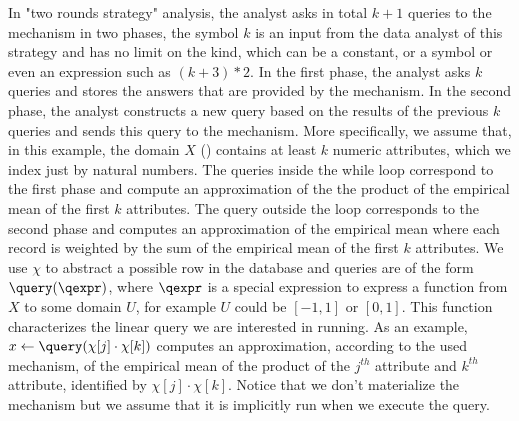 In "two rounds strategy" analysis, the analyst asks in total $k+1$ queries to the mechanism in two phases, the symbol $k$ is an input from the data analyst of this strategy and has no limit on the kind, which can be a constant, or a symbol or even an expression such as $(k+3)*2$.
In the first phase, the analyst asks $k$ queries and stores the answers that are provided by the mechanism. In the second phase, the analyst constructs a new query based on the results of the previous $k$ queries and sends this query to the mechanism. More specifically, we assume that, in this example, the domain $X$ 
() 
contains at least $k$ numeric attributes, which we index just by natural numbers. The queries inside the while loop correspond to the first phase and compute an approximation of the 
the product of the empirical mean of the first $k$ attributes. 
The query outside the loop corresponds to the second phase and computes an approximation of the empirical mean where each record is weighted by the sum of the empirical mean of the first $k$ attributes.
%
%
{We use $\chi$ to abstract a possible row in the database and }
queries are of the form $\query(\qexpr)$, where $\qexpr$ is a special expression 
to express a function from $X$ to some domain $U$, for example $U$ could be $[-1,1]$ or $[0,1]$. This function characterizes the linear query we are interested in running. As an example, $x \leftarrow \query(\chi[j] \cdot \chi[k])$ computes an approximation, according to the used mechanism, of the empirical mean of the product of the $j^{th}$ attribute and $k^{th}$ attribute, identified by $\chi[j] \cdot \chi[k]$. Notice that we don't materialize the mechanism but we assume that it is implicitly run when we execute the query.  

